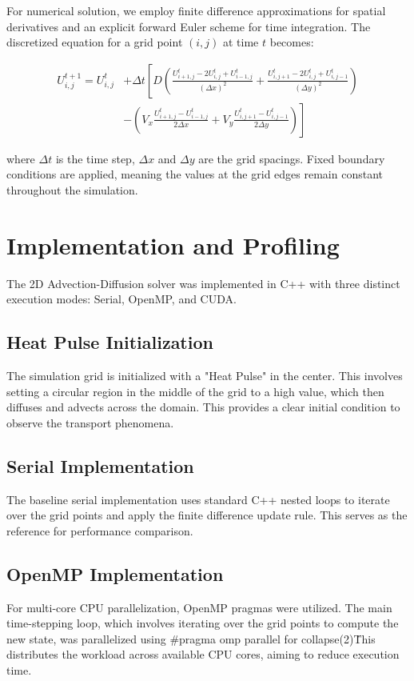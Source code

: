 \documentclass[conference]{IEEEtran}
\begin{document}
For numerical solution, we employ finite difference approximations for spatial derivatives and an explicit forward Euler scheme for time integration. The discretized equation for a grid point \((i, j)\) at time \(t\) becomes:

{\small
\begin{align*}
U_{i,j}^{t+1} = U_{i,j}^t &+ \Delta t \left[ D \left( \frac{U_{i+1,j}^t - 2U_{i,j}^t + U_{i-1,j}^t}{(\Delta x)^2} + \frac{U_{i,j+1}^t - 2U_{i,j}^t + U_{i,j-1}^t}{(\Delta y)^2} \right) \right. \\
&\left. - \left( V_x \frac{U_{i+1,j}^t - U_{i-1,j}^t}{2\Delta x} + V_y \frac{U_{i,j+1}^t - U_{i,j-1}^t}{2\Delta y} \right) \right]
\end{align*}
}

where \(\Delta t\) is the time step, \(\Delta x\) and \(\Delta y\) are the grid spacings. Fixed boundary conditions are applied, meaning the values at the grid edges remain constant throughout the simulation.

\section{Implementation and Profiling}

The 2D Advection-Diffusion solver was implemented in C++ with three distinct execution modes: Serial, OpenMP, and CUDA.

\subsection{Heat Pulse Initialization}
The simulation grid is initialized with a "Heat Pulse" in the center. This involves setting a circular region in the middle of the grid to a high value, which then diffuses and advects across the domain. This provides a clear initial condition to observe the transport phenomena.

\subsection{Serial Implementation}
The baseline serial implementation uses standard C++ nested loops to iterate over the grid points and apply the finite difference update rule. This serves as the reference for performance comparison.

\subsection{OpenMP Implementation}
For multi-core CPU parallelization, OpenMP pragmas were utilized. The main time-stepping loop, which involves iterating over the grid points to compute the new state, was parallelized using \#pragma omp parallel for collapse(2)\. This distributes the workload across available CPU cores, aiming to reduce execution time.
\end{document}
